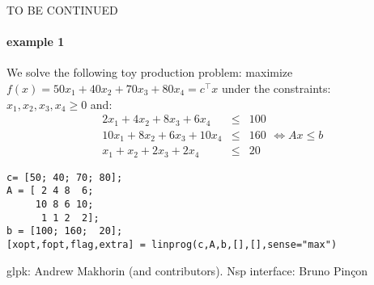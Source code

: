 \begin{mandescription}
TO BE CONTINUED

\end{mandescription} 

\begin{examples}
\paragraph{example 1} We solve the following toy production problem: maximize
$f(x) = 50 x_1 + 40 x_2 + 70 x_3 + 80 x_4 = c^{\top} x$ under the constraints:
$x_1, x_2, x_3, x_4 \ge  0$ and:
$$
\begin{array}{rcl}
   2 x_1 + 4 x_2 +  8 x_3 +  6 x_4 & \le & 100\\
   10 x_1 + 8 x_2 + 6 x_3 + 10 x_4 & \le & 160\\
      x_1 +  x_2  + 2 x_3 +  2 x_4 & \le & 20
\end{array} \iff  A x \le b
$$
\begin{Verbatim}
c= [50; 40; 70; 80];
A = [ 2 4 8  6;
     10 8 6 10;
      1 1 2  2];
b = [100; 160;  20];
[xopt,fopt,flag,extra] = linprog(c,A,b,[],[],sense="max")
\end{Verbatim}

\end{examples}

\begin{manseealso}

\end{manseealso}

\begin{authors}
 glpk: Andrew Makhorin (and contributors). Nsp interface: Bruno Pin\c{c}on
\end{authors}
